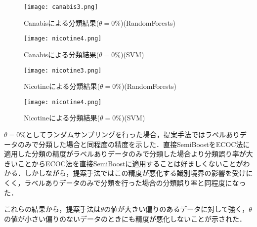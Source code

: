 \begin{figure}[H]
\centering
\texttt{[image: canabis3.png]}
\caption{Canabisによる分類結果($\theta=0\%$)(RandomForests)}
\label{canabis1}
\end{figure}\par
\begin{figure}[H]
\centering
\texttt{[image: nicotine4.png]}
\caption{Canabisによる分類結果($\theta=0\%$)(SVM)}
\label{canabis2}
\end{figure}\par


\begin{figure}[H]
\centering
\texttt{[image: nicotine3.png]}
\caption{Nicotineによる分類結果($\theta=0\%$)(RandomForests)}
\label{nicotine1}
\end{figure}\par
\begin{figure}[H]
\centering
\texttt{[image: nicotine4.png]}
\caption{Nicotineによる分類結果($\theta=0\%$)(SVM)}
\label{nicotine2}
\end{figure}\par

$\theta=0\%$としてランダムサンプリングを行った場合，提案手法ではラベルありデータのみで分類した場合と同程度の精度を示した．直接SemiBoostをECOC法に適用した分類の精度がラベルありデータのみで分類した場合より分類誤り率が大きいことからECOC法を直接SemiBoostに適用することは好ましくないことがわかる．しかしながら，提案手法ではこの精度が悪化する識別境界の影響を受けにくく，ラベルありデータのみで分類を行った場合の分類誤り率と同程度になった．\par

これらの結果から，提案手法は$\theta$の値が大きい偏りのあるデータに対して強く，$\theta$の値が小さい偏りのないデータのときにも精度が悪化しないことが示された．






